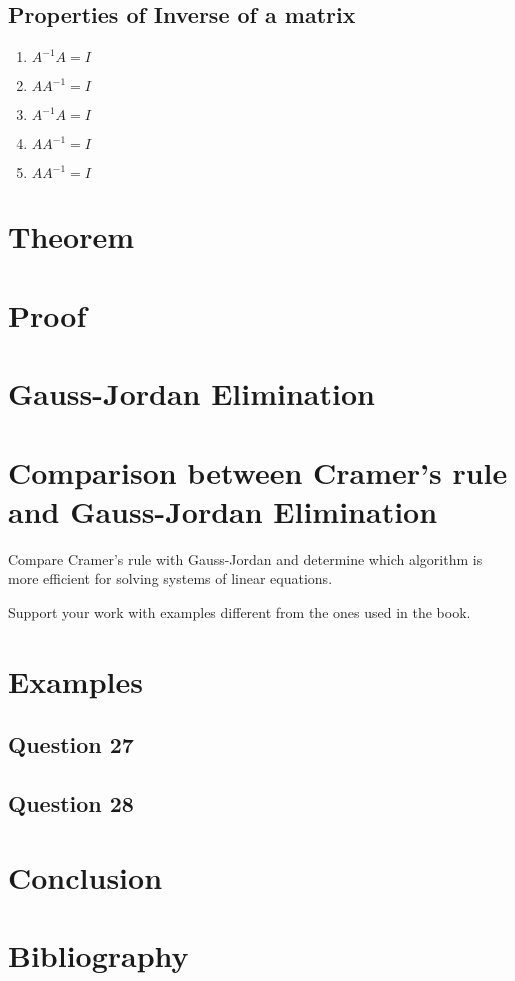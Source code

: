 \documentclass[titlepage,a4paper]{article}
\begin{document}
	\subsection{Properties of Inverse of a matrix}
		\begin{enumerate}
			\item $A^{-1}A=I$
			\item $AA^{-1}=I$
			\item $A^{-1}A=I$
			\item $AA^{-1}=I$
			\item $AA^{-1}=I$
		\end{enumerate}

	\section{Theorem}\label{sec:theorem}
		
	\newpage

  	\section{Proof}\label{sec:proof}
	\newpage
	
	\section{Gauss-Jordan Elimination}\label{sec:gauss-jordan-elimination}
	\newpage
  	
	\section{Comparison between Cramer's rule and Gauss-Jordan Elimination}\label{sec:comparison-between-cramer's-rule-and-gauss-jordan-elimination}
	\textnormal{Compare Cramer's rule with Gauss-Jordan and determine which algorithm is more efficient for solving systems of linear equations.}

		\textnormal{Support your work with examples different from the ones used in the book.}
    	\newpage
	
	\section{Examples}\label{sec:examples}

	\subsection{Question 27}\label{subsec:question-27}

	\subsection{Question 28}\label{subsec:question-28}
	\newpage
	
	\section{Conclusion}\label{sec:conclusion}
	\newpage
	
	\section{Bibliography}\label{sec:bibliography}
\end{document}
